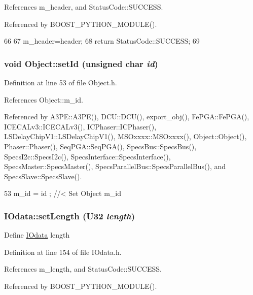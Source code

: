 References m\_\-header, and StatusCode::SUCCESS.

Referenced by BOOST\_\-PYTHON\_\-MODULE().


\begin{DoxyCode}
66                                   {
67     m_header=header;
68     return StatusCode::SUCCESS;
69   }
\end{DoxyCode}
\hypertarget{classObject_a398fe08cba594a0ce6891d59fe4f159f}{
\subsubsection[{setId}]{\setlength{\rightskip}{0pt plus 5cm}void Object::setId (unsigned char {\em id})}}
\label{classObject_a398fe08cba594a0ce6891d59fe4f159f}


Definition at line 53 of file Object.h.

References Object::m\_\-id.

Referenced by A3PE::A3PE(), DCU::DCU(), export\_\-obj(), FePGA::FePGA(), ICECALv3::ICECALv3(), ICPhaser::ICPhaser(), LSDelayChipV1::LSDelayChipV1(), MSOxxxx::MSOxxxx(), Object::Object(), Phaser::Phaser(), SeqPGA::SeqPGA(), SpecsBus::SpecsBus(), SpecsI2c::SpecsI2c(), SpecsInterface::SpecsInterface(), SpecsMaster::SpecsMaster(), SpecsParallelBus::SpecsParallelBus(), and SpecsSlave::SpecsSlave().


\begin{DoxyCode}
53 { m_id    = id    ; } //< Set Object m_id
\end{DoxyCode}
\hypertarget{classIOdata_affaf98e7f9e596263e914b055f8f93c2}{
\subsubsection[{setLength}]{ IOdata::setLength ({\bf U32} {\em length})}}
\label{classIOdata_affaf98e7f9e596263e914b055f8f93c2}
Define \hyperlink{classIOdata}{IOdata} length 

Definition at line 154 of file IOdata.h.

References m\_\-length, and StatusCode::SUCCESS.

Referenced by BOOST\_\-PYTHON\_\-MODULE().


